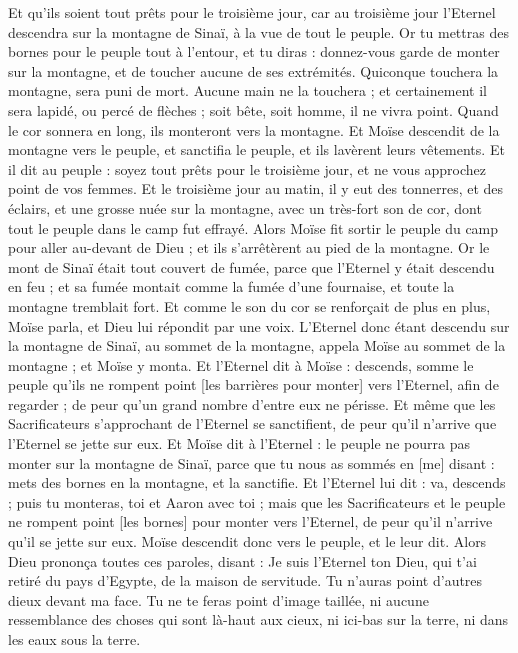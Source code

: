 \begin{multicols}{2}
Et qu'ils soient tout prêts pour le troisième jour, car au troisième jour l'Eternel descendra sur la montagne de Sinaï, à la vue de tout le peuple.
Or tu mettras des bornes pour le peuple tout à l’entour, et tu diras : donnez-vous garde de monter sur la montagne, et de toucher aucune de ses extrémités. Quiconque touchera la montagne, sera puni de mort.
Aucune main ne la touchera ; et certainement il sera lapidé, ou percé de flèches ; soit bête, soit homme, il ne vivra point. Quand le cor sonnera en long, ils monteront vers la montagne.
Et Moïse descendit de la montagne vers le peuple, et sanctifia le peuple, et ils lavèrent leurs vêtements.
Et il dit au peuple : soyez tout prêts pour le troisième jour, et ne vous approchez point de vos femmes.
Et le troisième jour au matin, il y eut des tonnerres, et des éclairs, et une grosse nuée sur la montagne, avec un très-fort son de cor, dont tout le peuple dans le camp fut effrayé.
Alors Moïse fit sortir le peuple du camp pour aller au-devant de Dieu ; et ils s'arrêtèrent au pied de la montagne.
Or le mont de Sinaï était tout couvert de fumée, parce que l'Eternel y était descendu en feu ; et sa fumée montait comme la fumée d'une fournaise, et toute la montagne tremblait fort.
Et comme le son du cor se renforçait de plus en plus, Moïse parla, et Dieu lui répondit par une voix.
L'Eternel donc étant descendu sur la montagne de Sinaï, au sommet de la montagne, appela Moïse au sommet de la montagne ; et Moïse y monta.
Et l'Eternel dit à Moïse : descends, somme le peuple qu'ils ne rompent point [les barrières pour monter] vers l'Eternel, afin de regarder ; de peur qu'un grand nombre d'entre eux ne périsse.
Et même que les Sacrificateurs s'approchant de l'Eternel se sanctifient, de peur qu'il n'arrive que l'Eternel se jette sur eux.
Et Moïse dit à l'Eternel : le peuple ne pourra pas monter sur la montagne de Sinaï, parce que tu nous as sommés en [me] disant : mets des bornes en la montagne, et la sanctifie.
Et l'Eternel lui dit : va, descends ; puis tu monteras, toi et Aaron avec toi ; mais que les Sacrificateurs et le peuple ne rompent point [les bornes] pour monter vers l'Eternel, de peur qu'il n'arrive qu'il se jette sur eux.
Moïse descendit donc vers le peuple, et le leur dit.
\VerseOne{}Alors Dieu prononça toutes ces paroles, disant :
Je suis l'Eternel ton Dieu, qui t'ai retiré du pays d'Egypte, de la maison de servitude.
Tu n'auras point d'autres dieux devant ma face.
Tu ne te feras point d'image taillée, ni aucune ressemblance des choses qui sont là-haut aux cieux, ni ici-bas sur la terre, ni dans les eaux sous la terre.

\end{multicols}
